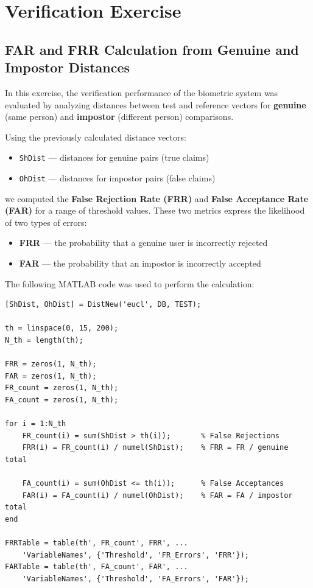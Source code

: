 \documentclass[a4paper,12pt]{article}
\begin{document}
\section{Verification Exercise}

\subsection{FAR and FRR Calculation from Genuine and Impostor Distances}

\noindent
In this exercise, the verification performance of the biometric system was evaluated by analyzing distances between test and reference vectors for \textbf{genuine} (same person) and \textbf{impostor} (different person) comparisons.

\vspace{0.5em}
\noindent
Using the previously calculated distance vectors:
\begin{itemize}[noitemsep]
    \item \texttt{ShDist} — distances for genuine pairs (true claims)
    \item \texttt{OhDist} — distances for impostor pairs (false claims)
\end{itemize}

\noindent
we computed the \textbf{False Rejection Rate (FRR)} and \textbf{False Acceptance Rate (FAR)} for a range of threshold values. These two metrics express the likelihood of two types of errors:

\begin{itemize}[noitemsep]
    \item \textbf{FRR} — the probability that a genuine user is incorrectly rejected
    \item \textbf{FAR} — the probability that an impostor is incorrectly accepted
\end{itemize}

\vspace{0.5em}
\noindent
The following MATLAB code was used to perform the calculation:

\begin{verbatim}
[ShDist, OhDist] = DistNew('eucl', DB, TEST);

th = linspace(0, 15, 200);
N_th = length(th);

FRR = zeros(1, N_th);
FAR = zeros(1, N_th);
FR_count = zeros(1, N_th);
FA_count = zeros(1, N_th);

for i = 1:N_th
    FR_count(i) = sum(ShDist > th(i));       % False Rejections
    FRR(i) = FR_count(i) / numel(ShDist);    % FRR = FR / genuine total

    FA_count(i) = sum(OhDist <= th(i));      % False Acceptances
    FAR(i) = FA_count(i) / numel(OhDist);    % FAR = FA / impostor total
end

FRRTable = table(th', FR_count', FRR', ...
    'VariableNames', {'Threshold', 'FR_Errors', 'FRR'});
FARTable = table(th', FA_count', FAR', ...
    'VariableNames', {'Threshold', 'FA_Errors', 'FAR'});
\end{verbatim}
\end{document}
